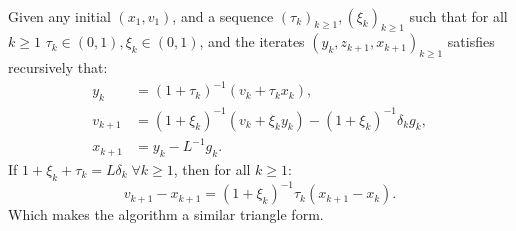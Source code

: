 \documentclass[12pt]{article}
\begin{document}
    \begin{proposition}\label{prop:abs-st-form}\;\\
        Given any initial $(x_1, v_1)$, and a sequence $(\tau_k)_{k \ge 1}, (\xi_k)_{k \ge 1}$ such that for all $k \ge 1$ $\tau_k \in (0, 1), \xi_k \in (0, 1)$, and the iterates $(y_k, z_{k + 1}, x_{k + 1})_{k \ge 1}$ satisfies recursively that: 
        \begin{align*}
            y_k &= (1 + \tau_k)^{-1}(v_k + \tau_k x_k),
            \\
            v_{k + 1} &= (1 + \xi_k)^{-1}(v_k + \xi_k y_k) - (1 + \xi_k)^{-1}\delta_k g_k,
            \\
            x_{k + 1} &= y_k - L^{-1} g_k. 
        \end{align*}
        If $1 + \xi_k + \tau_k = L\delta_k\; \forall k \ge 1$, then for all $k \ge 1$: 
        $$
            v_{k + 1} - x_{k + 1} = (1 + \xi_k)^{-1}\tau_k(x_{k + 1} - x_k). 
        $$
        Which makes the algorithm a similar triangle form. 
    \end{proposition}
\end{document}
